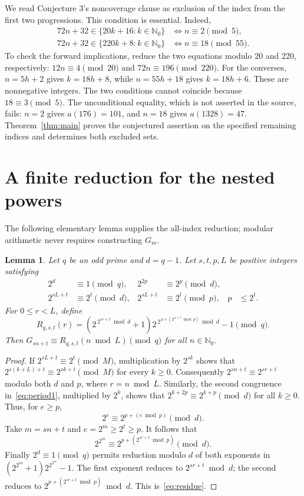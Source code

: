 \documentclass[11pt]{article}
\newtheorem{lemma}{Lemma}
\newcommand{\N}{\mathbb{N}_0}
\begin{document}
We read Conjecture 3's noncoverage clause as exclusion of the index from
the first two progressions. This condition is essential. Indeed,
\begin{align*}
 72n+32\in\{20k+16:k\in\N\}&\iff n\equiv2\pmod5,\\
 72n+32\in\{220k+8:k\in\N\}&\iff n\equiv18\pmod{55}.
\end{align*}
To check the forward implications, reduce the two equations modulo 20 and 220,
respectively: $12n\equiv4\pmod{20}$ and $72n\equiv196\pmod{220}$.
For the converses, $n=5h+2$ gives $k=18h+8$, while $n=55h+18$ gives $k=18h+6$.
These are nonnegative integers. The two conditions cannot coincide because
$18\equiv3\pmod5$.
The unconditional equality, which is not asserted in the source, fails:
$n=2$ gives $a(176)=101$, and $n=18$ gives $a(1328)=47$.
Theorem~\ref{thm:main} proves the conjectured assertion on the specified
remaining indices and determines both excluded sets.

\section{A finite reduction for the nested powers}
The following elementary lemma supplies the all-index reduction; modular
arithmetic never requires constructing $G_m$.

\begin{lemma}\label{lem:reduction}
Let $q$ be an odd prime and $d=q-1$. Let $s,t,p,L$ be positive integers
satisfying
\begin{align}
 2^d&\equiv1\pmod q,&
 2^{2p}&\equiv2^p\pmod d,\label{eq:period1}\\
 2^{sL+t}&\equiv2^t\pmod d,&
 2^{sL+t}&\equiv2^t\pmod p,&p&\leq2^t.\label{eq:period2}
\end{align}
For $0\leq r<L$, define
\begin{equation}\label{eq:residue}
 R_{q,s,t}(r)=
 \left(2^{\,2^{sr+t}\bmod d}+1\right)
 2^{\,2^{\,p+(2^{sr+t}\bmod p)}\bmod d}-1\pmod q.
\end{equation}
Then $G_{sn+t}\equiv R_{q,s,t}(n\bmod L)\pmod q$ for all $n\in\N$.
\end{lemma}

\begin{proof}
If $2^{sL+t}\equiv2^t\pmod M$, multiplication by $2^{sk}$ shows that
$2^{s(k+L)+t}\equiv2^{sk+t}\pmod M$ for every $k\geq0$.
Consequently $2^{sn+t}\equiv2^{sr+t}$ modulo both $d$ and $p$, where
$r=n\bmod L$.
Similarly, the second congruence in~\eqref{eq:period1}, multiplied by $2^k$,
shows that $2^{k+2p}\equiv2^{k+p}\pmod d$ for all $k\geq0$.
Thus, for $e\geq p$,
\[
 2^e\equiv2^{p+(e\bmod p)}\pmod d.
\]
Take $m=sn+t$ and $e=2^m\geq2^t\geq p$. It follows that
\[
 2^{2^m}\equiv2^{p+(2^{sr+t}\bmod p)}\pmod d.
\]
Finally $2^d\equiv1\pmod q$ permits reduction modulo $d$ of both exponents
in $(2^{2^m}+1)2^{2^{2^m}}-1$.
The first exponent reduces to $2^{sr+t}\bmod d$; the second reduces to
$2^{p+(2^{sr+t}\bmod p)}\bmod d$. This is~\eqref{eq:residue}.
\end{proof}
\end{document}
